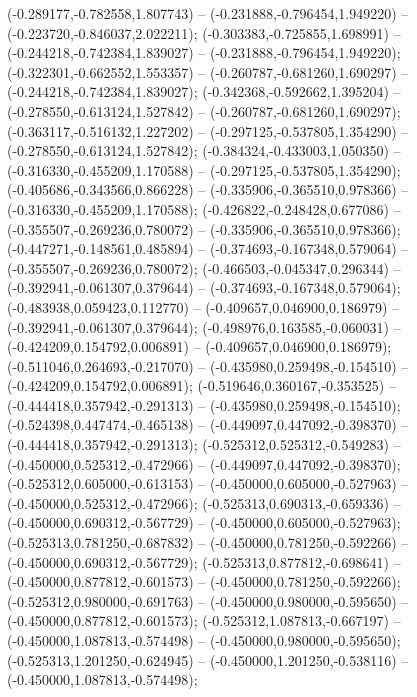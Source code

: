  (-0.289177,-0.782558,1.807743) -- (-0.231888,-0.796454,1.949220) -- (-0.223720,-0.846037,2.022211);
 (-0.303383,-0.725855,1.698991) -- (-0.244218,-0.742384,1.839027) -- (-0.231888,-0.796454,1.949220);
 (-0.322301,-0.662552,1.553357) -- (-0.260787,-0.681260,1.690297) -- (-0.244218,-0.742384,1.839027);
 (-0.342368,-0.592662,1.395204) -- (-0.278550,-0.613124,1.527842) -- (-0.260787,-0.681260,1.690297);
 (-0.363117,-0.516132,1.227202) -- (-0.297125,-0.537805,1.354290) -- (-0.278550,-0.613124,1.527842);
 (-0.384324,-0.433003,1.050350) -- (-0.316330,-0.455209,1.170588) -- (-0.297125,-0.537805,1.354290);
 (-0.405686,-0.343566,0.866228) -- (-0.335906,-0.365510,0.978366) -- (-0.316330,-0.455209,1.170588);
 (-0.426822,-0.248428,0.677086) -- (-0.355507,-0.269236,0.780072) -- (-0.335906,-0.365510,0.978366);
 (-0.447271,-0.148561,0.485894) -- (-0.374693,-0.167348,0.579064) -- (-0.355507,-0.269236,0.780072);
 (-0.466503,-0.045347,0.296344) -- (-0.392941,-0.061307,0.379644) -- (-0.374693,-0.167348,0.579064);
 (-0.483938,0.059423,0.112770) -- (-0.409657,0.046900,0.186979) -- (-0.392941,-0.061307,0.379644);
 (-0.498976,0.163585,-0.060031) -- (-0.424209,0.154792,0.006891) -- (-0.409657,0.046900,0.186979);
 (-0.511046,0.264693,-0.217070) -- (-0.435980,0.259498,-0.154510) -- (-0.424209,0.154792,0.006891);
 (-0.519646,0.360167,-0.353525) -- (-0.444418,0.357942,-0.291313) -- (-0.435980,0.259498,-0.154510);
 (-0.524398,0.447474,-0.465138) -- (-0.449097,0.447092,-0.398370) -- (-0.444418,0.357942,-0.291313);
 (-0.525312,0.525312,-0.549283) -- (-0.450000,0.525312,-0.472966) -- (-0.449097,0.447092,-0.398370);
 (-0.525312,0.605000,-0.613153) -- (-0.450000,0.605000,-0.527963) -- (-0.450000,0.525312,-0.472966);
 (-0.525313,0.690313,-0.659336) -- (-0.450000,0.690312,-0.567729) -- (-0.450000,0.605000,-0.527963);
 (-0.525313,0.781250,-0.687832) -- (-0.450000,0.781250,-0.592266) -- (-0.450000,0.690312,-0.567729);
 (-0.525313,0.877812,-0.698641) -- (-0.450000,0.877812,-0.601573) -- (-0.450000,0.781250,-0.592266);
 (-0.525312,0.980000,-0.691763) -- (-0.450000,0.980000,-0.595650) -- (-0.450000,0.877812,-0.601573);
 (-0.525312,1.087813,-0.667197) -- (-0.450000,1.087813,-0.574498) -- (-0.450000,0.980000,-0.595650);
 (-0.525313,1.201250,-0.624945) -- (-0.450000,1.201250,-0.538116) -- (-0.450000,1.087813,-0.574498);
